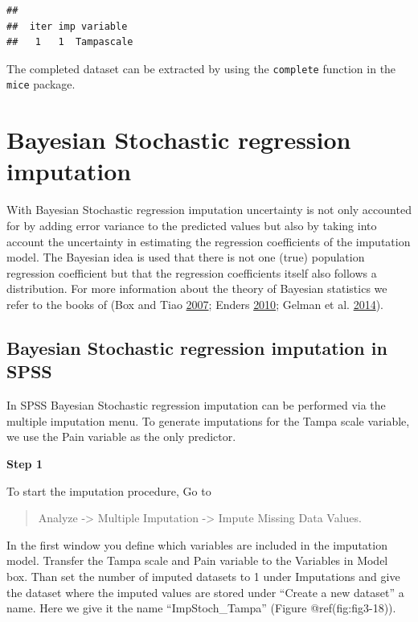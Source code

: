 \documentclass[
]{book}
\begin{document}
\begin{verbatim}
## 
##  iter imp variable
##   1   1  Tampascale
\end{verbatim}

The completed dataset can be extracted by using the \texttt{complete}
function in the \texttt{mice} package.

\hypertarget{bayesian-stochastic-regression-imputation}{%
\section{Bayesian Stochastic regression
imputation}\label{bayesian-stochastic-regression-imputation}}

With Bayesian Stochastic regression imputation uncertainty is not only
accounted for by adding error variance to the predicted values but also
by taking into account the uncertainty in estimating the regression
coefficients of the imputation model. The Bayesian idea is used that
there is not one (true) population regression coefficient but that the
regression coefficients itself also follows a distribution. For more
information about the theory of Bayesian statistics we refer to the
books of (Box and Tiao
\protect\hyperlink{ref-box2007bayesianinferencein}{2007}; Enders
\protect\hyperlink{ref-enders2010applied}{2010}; Gelman et al.
\protect\hyperlink{ref-gelman2014bayesian}{2014}).

\hypertarget{bayesian-stochastic-regression-imputation-in-spss}{%
\subsection{Bayesian Stochastic regression imputation in
SPSS}\label{bayesian-stochastic-regression-imputation-in-spss}}

In SPSS Bayesian Stochastic regression imputation can be performed via
the multiple imputation menu. To generate imputations for the Tampa
scale variable, we use the Pain variable as the only predictor.

\textbf{Step 1}

To start the imputation procedure, Go to

\begin{quote}
Analyze -\textgreater{} Multiple Imputation -\textgreater{} Impute
Missing Data Values.
\end{quote}

In the first window you define which variables are included in the
imputation model. Transfer the Tampa scale and Pain variable to the
Variables in Model box. Than set the number of imputed datasets to 1
under Imputations and give the dataset where the imputed values are
stored under ``Create a new dataset'' a name. Here we give it the name
``ImpStoch\_Tampa'' (Figure @ref(fig:fig3-18)).
\end{document}
